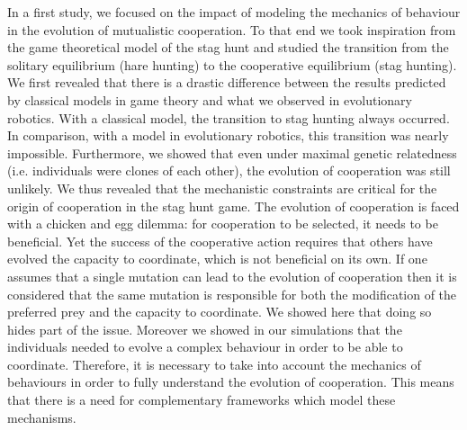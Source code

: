		In a first study, we focused on the impact of modeling the mechanics of behaviour in the evolution of mutualistic cooperation. To that end we took inspiration from the game theoretical model of the stag hunt and studied the transition from the solitary equilibrium (hare hunting) to the cooperative equilibrium (stag hunting). We first revealed that there is a drastic difference between the results predicted by classical models in game theory and what we observed in evolutionary robotics. With a classical model, the transition to stag hunting always occurred. In comparison, with a model in evolutionary robotics, this transition was nearly impossible. Furthermore, we showed that even under maximal genetic relatedness (i.e. individuals were clones of each other), the evolution of cooperation was still unlikely. We thus revealed that the mechanistic constraints are critical for the origin of cooperation in the stag hunt game. The evolution of cooperation is faced with a chicken and egg dilemma: for cooperation to be selected, it needs to be beneficial. Yet the success of the cooperative action requires that others have evolved the capacity to coordinate, which is not beneficial on its own. If one assumes that a single mutation can lead to the evolution of cooperation then it is considered that the same mutation is responsible for both the modification of the preferred prey and the capacity to coordinate. We showed here that doing so hides part of the issue. Moreover we showed in our simulations that the individuals needed to evolve a complex behaviour in order to be able to coordinate. Therefore, it is necessary to take into account the mechanics of behaviours in order to fully understand the evolution of cooperation. This means that there is a need for complementary frameworks which model these mechanisms.

